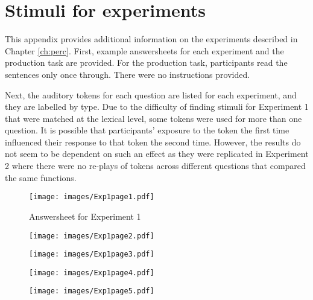 \chapter{Stimuli for  experiments}\label{appen:stimuli}

\noindent This appendix provides additional information on the  experiments described in Chapter \ref{ch:perc}.  First, example answersheets for each experiment and the production task are provided.  For the production task, participants read the sentences only once through.  There were no instructions provided.  

Next, the auditory tokens for each question are listed for each experiment, and they are labelled by type.  Due to the difficulty of finding stimuli for Experiment 1 that were matched at the lexical level, some tokens were used for more than one question.  It is possible that participants' exposure to the token the first time influenced their response to that token the second time.  However, the results do not seem to be dependent on such an effect as they were replicated in Experiment 2 where there were no re-plays of tokens across different questions that compared the same functions.




\begin{figure}[htbp]
	\centering
		\texttt{[image: images/Exp1page1.pdf]}
		\caption{Answersheet for Experiment 1}
		\label{x1p1}
\end{figure}

\begin{figure}[htbp]
	\centering
		\texttt{[image: images/Exp1page2.pdf]}
		\label{x1p2}
\end{figure}

\begin{figure}[htbp]
	\centering
		\texttt{[image: images/Exp1page3.pdf]}
		\label{x1p3}
\end{figure}

\begin{figure}[htbp]
	\centering
		\texttt{[image: images/Exp1page4.pdf]}
		\label{x1p4}
\end{figure}

\begin{figure}[htbp]
	\centering
		\texttt{[image: images/Exp1page5.pdf]}
		\label{x1p5}
\end{figure}

